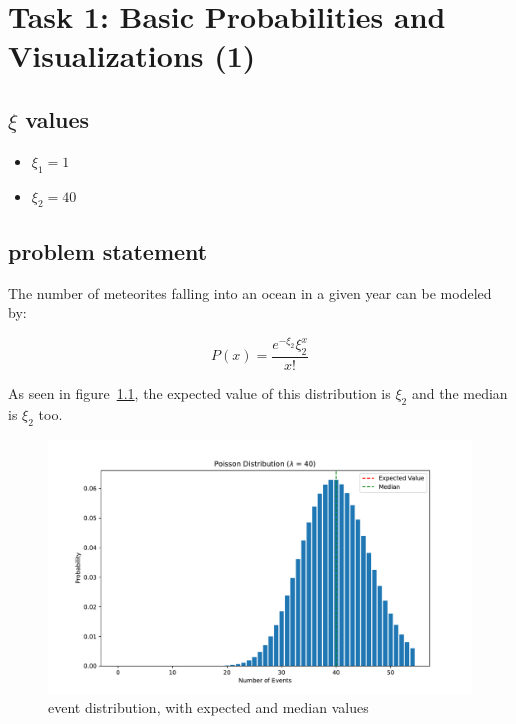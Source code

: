 \chapter{Task  1: Basic Probabilities and Visualizations (1)}

\section*{$\xi$ values}

\begin{itemize}
    \item $\xi_1 = 1$
    \item $\xi_2 = 40$
\end{itemize}

\section{problem statement}

The number of meteorites falling into an ocean in a given year can be modeled by:

\begin{equation}
    P\left( x \right) = \frac{{e^{ - \xi_2 } \xi_2 ^x }}{{x!}}
\end{equation}

As seen in figure~\ref{fig:poisson}, the expected value of this distribution is $\xi_2$ and the median is $\xi_2$ too.

\begin{figure}[h]
\centering
\includegraphics[width=13cm]{code/figures/poisson_distribution.pdf}
\caption{event distribution, with expected and median values\label{fig:poisson}}
\end{figure}
\FloatBarrier

